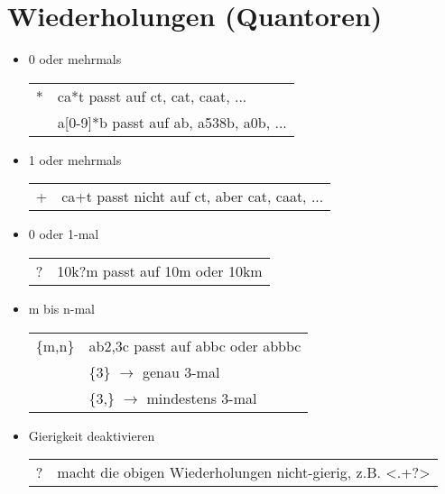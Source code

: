 \section{Wiederholungen (Quantoren)}
\begin{itemize}
	\item 0 oder mehrmals\\
	\begin{tabular}{ll}
		*& ca*t passt auf ct, cat, caat, ...\\
		& a[0-9]*b passt auf ab, a538b, a0b, ...\\
	\end{tabular}
	\item 1 oder mehrmals\\
	\begin{tabular}{ll}
		+& ca+t passt nicht auf ct, aber cat, caat, ...\\
	\end{tabular}
	\item 0 oder 1-mal\\
	\begin{tabular}{ll}
		?& 10k?m passt auf 10m oder 10km\\
	\end{tabular}
	\item m bis n-mal\\
	\begin{tabular}{ll}
		\{m,n\}& ab{2,3}c passt auf abbc oder abbbc\\
		& \{3\} $\rightarrow$ genau 3-mal\\
		& \{3,\} $\rightarrow$ mindestens 3-mal\\
	\end{tabular}
	\item Gierigkeit deaktivieren\\
	\begin{tabular}{ll}
		?& macht die obigen Wiederholungen nicht-gierig, z.B. <.+?>
	\end{tabular}
\end{itemize}

